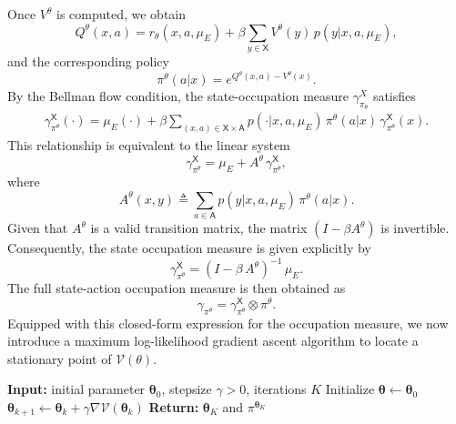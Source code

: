 \documentclass[11pt]{article}
\newcommand{\btheta}{{\boldsymbol \theta}}
\newcommand{\sX}{{\mathsf X}}
\newcommand{\sA}{{\mathsf A}}
\newcommand{\V}{{\mathcal V}}
\newcommand{\lk}[1]{\textcolor{black}{#1}} %
\begin{document}
Once $V^\theta$ is computed, we obtain
$$Q^{\theta}(x,a) 
= r_{\theta}(x,a,\mu_E)  
+ \beta \sum_{y \in \sX} V^{\theta}(y) \, p(y|x,a,\mu_E),$$
and the corresponding policy
\[
\pi^{\theta}(a|x) = e^{Q^{\theta}(x,a)-V^{\theta}(x)}.
\]
By the Bellman flow condition, the state-occupation measure $\gamma^X_{\pi_\theta}$ satisfies
\begin{align*}
\gamma_{\pi^{\theta}}^{\sX}(\cdot) 
= \mu_E(\cdot) 
+ \beta \sum_{(x,a) \in \sX\times\sA} p(\cdot|x,a,\mu_E) \, \pi^{\theta}(a|x) \, \gamma_{\pi^{\theta}}^{\sX}(x).
\end{align*}
This relationship is equivalent to the linear system
\[
\gamma_{\pi^{\theta}}^{\sX} = \mu_E + A^{\theta} \, \gamma_{\pi^{\theta}}^{\sX},
\]
where
\[
A^{\theta}(x,y) \triangleq \sum_{a \in \sA} p(y|x,a,\mu_E) \, \pi^{\theta}(a|x).
\]
Given that $A^\theta$ is a valid transition matrix, the matrix $(I - \beta A^{\theta})$ is invertible. Consequently, the state occupation measure is given explicitly by
\[
\gamma_{\pi^{\theta}}^{\sX} = (I - \beta \,A^{\theta})^{-1} \, \mu_E.
\]
The full state-action occupation measure is then obtained as
\[
\gamma_{\pi^{\theta}} = \gamma_{\pi^{\theta}}^{\sX} \otimes \pi^{\theta}.
\]
 Equipped with this closed-form expression for the occupation measure, we now introduce a maximum log-likelihood gradient ascent algorithm to locate a stationary point of $\mathcal{V}(\theta)$. 
 


\begin{algorithm}[H]
	\caption{\lk{Maximum Log-Likelihood Gradient Ascent}}
	\label{GD}
	\begin{algorithmic}[1]
\STATE \textbf{Input:} initial parameter $\btheta_0$, stepsize $\gamma > 0$, iterations $K$
\STATE Initialize $\btheta \leftarrow \btheta_0$
    \STATE $\btheta_{k+1} \leftarrow \btheta_k + \gamma \nabla \mathcal{V}(\btheta_k)$
\ENDFOR
\STATE \textbf{Return:} $\btheta_K$ and $\pi^{\btheta_K}$
\end{algorithmic}

\end{algorithm}
\end{document}

